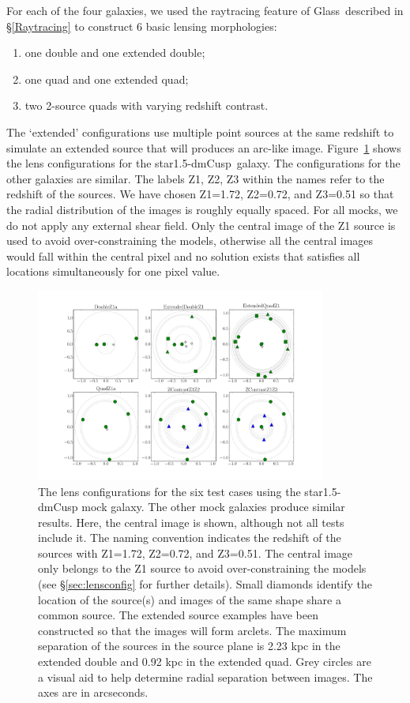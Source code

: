 \documentclass[galley,usenatbib]{mn2e}
\newcommand{\Glass}{{\sc Glass}}
\newcommand{\figref}[1] {Figure~\ref{#1}}
\newcommand{\secref}[1] {\S\ref{#1}}
\newcommand{\mockBC}{{\sc star1.5-dmCusp}}
\begin{document}
For each of the four galaxies, we used the raytracing feature of \Glass\
described in \secref{Raytracing} to construct 6 basic lensing morphologies:

\begin{enumerate}
\item one double and one extended double;
\item one quad and one extended quad;
\item two 2-source quads with varying redshift contrast.
\end{enumerate}
The `extended' configurations use multiple point sources at the same redshift
to simulate an extended source that will produces an arc-like image.
\figref{arrival surfaces} shows the lens configurations for the \mockBC\
galaxy. 
The configurations for the other galaxies are similar.  The labels Z1, Z2, Z3
within the names refer to the redshift of the sources. We have chosen Z1=1.72,
Z2=0.72, and Z3=0.51 so that the radial distribution of the images is roughly
equally spaced. For all mocks, we do not apply any external shear field.  Only
the central image of the Z1 source is used to avoid over-constraining the
models, otherwise all the central images would fall within the central pixel
and no solution exists that satisfies all locations simultaneously for one
pixel value.

\begin{figure}
\includegraphics[width=0.85\textwidth]{BCarrival_surfaces}
\caption{The lens configurations for the six test cases using the \mockBC{}
mock galaxy. The other mock galaxies produce similar results. Here, the central
image is shown, although not all tests include it. 
The naming convention indicates the redshift of the
sources with Z1=1.72, Z2=0.72, and Z3=0.51.  The central image only belongs to
the Z1 source to avoid over-constraining the models (see
\secref{sec:lensconfig} for further details). 
Small diamonds identify the location of the source(s) and images of the same shape share a
common source. The extended source examples have been constructed so that the
images will form arclets.  The maximum separation of the sources in the source plane
is 2.23 kpc in the extended double and 0.92 kpc in the extended quad. Grey
circles are a visual aid to help determine radial separation between images.
The axes are in arcseconds.}
\label{arrival surfaces}
\end{figure}
\end{document}

